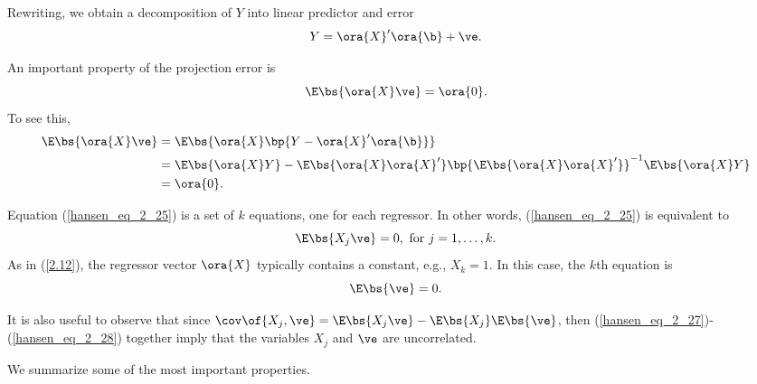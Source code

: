 Rewriting, we obtain a decomposition of $Y$ into linear predictor and error 
\begin{equation}
    \label{hansen_eq_2_24}
    Y = \ora{X}^\prime \ora{\b} + \ve .
\end{equation}

An important property of the projection error is 
\begin{equation}
    \label{hansen_eq_2_25}
    \E\bs{\ora{X}\ve} = \ora{0}.
\end{equation}
To see this, 
\begin{equation}
    \label{hansen_eq_2_26}
    \begin{aligned}
        \E\bs{\ora{X}\ve} & = \E\bs{\ora{X} \bp{Y - \ora{X}^\prime \ora{\b}}} \\ 
        & = \E\bs{\ora{X}Y} - \E\bs{\ora{X}\ora{X}^\prime}\bp{\E\bs{\ora{X}\ora{X}^\prime}}^{-1} \E\bs{\ora{X}Y} \\
        & = \ora{0}.
    \end{aligned}
\end{equation}

Equation (\ref{hansen_eq_2_25}) is a set of $k$ equations, one for each regressor. In other words, (\ref{hansen_eq_2_25}) is equivalent to 
\begin{equation}
    \label{hansen_eq_2_27}
    \E\bs{X_j \ve} = 0, \text{ for } j = 1, \ldots, k.
\end{equation}
As in (\ref{2.12}), the regressor vector $\ora{X}$ typically contains a constant, e.g., $X_k = 1$. In this case, the $k$th equation is 
\begin{equation}
    \label{hansen_eq_2_28}
    \E\bs{\ve} = 0.
\end{equation}

It is also useful to observe that since $\cov\of{X_j, \ve} = \E\bs{X_j \ve} - \E\bs{X_j}\E\bs{\ve}$, then (\ref{hansen_eq_2_27})-(\ref{hansen_eq_2_28}) together imply that the variables $X_j$ and $\ve$ are uncorrelated.

We summarize some of the most important properties.

